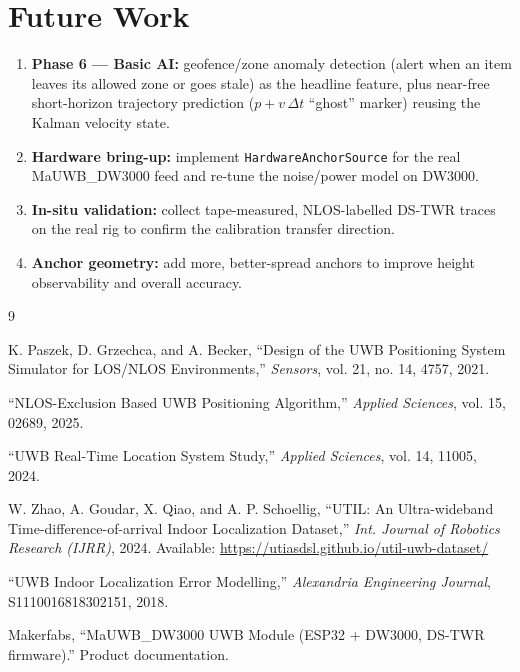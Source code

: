 \documentclass[a4paper,12pt,onecolumn]{report}
\begin{document}
\section{Future Work}
\begin{enumerate}[nosep]
  \item \textbf{Phase 6 --- Basic AI:} geofence/zone anomaly detection (alert when
        an item leaves its allowed zone or goes stale) as the headline feature,
        plus near-free short-horizon trajectory prediction ($p + v\,\Delta t$
        ``ghost'' marker) reusing the Kalman velocity state.
  \item \textbf{Hardware bring-up:} implement \texttt{HardwareAnchorSource} for
        the real MaUWB\_DW3000 feed and re-tune the noise/power model on DW3000.
  \item \textbf{In-situ validation:} collect tape-measured, NLOS-labelled DS-TWR
        traces on the real rig to confirm the calibration transfer direction.
  \item \textbf{Anchor geometry:} add more, better-spread anchors to improve
        height observability and overall accuracy.
\end{enumerate}

\begin{thebibliography}{9}

K. Paszek, D. Grzechca, and A. Becker,
``Design of the UWB Positioning System Simulator for LOS/NLOS Environments,''
\emph{Sensors}, vol. 21, no. 14, 4757, 2021.

``NLOS-Exclusion Based UWB Positioning Algorithm,''
\emph{Applied Sciences}, vol. 15, 02689, 2025.

``UWB Real-Time Location System Study,''
\emph{Applied Sciences}, vol. 14, 11005, 2024.

W. Zhao, A. Goudar, X. Qiao, and A. P. Schoellig,
``UTIL: An Ultra-wideband Time-difference-of-arrival Indoor Localization Dataset,''
\emph{Int. Journal of Robotics Research (IJRR)}, 2024.
Available: \url{https://utiasdsl.github.io/util-uwb-dataset/}

``UWB Indoor Localization Error Modelling,''
\emph{Alexandria Engineering Journal}, S1110016818302151, 2018.

Makerfabs, ``MaUWB\_DW3000 UWB Module (ESP32 + DW3000, DS-TWR firmware).''
Product documentation.

\end{thebibliography}
\end{document}
